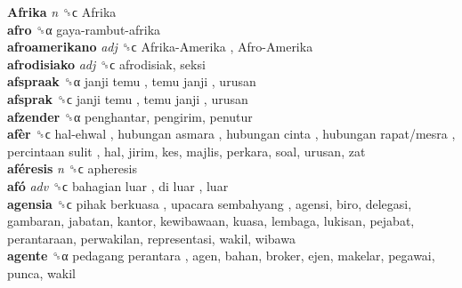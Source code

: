 \textbf{Afrika} \emph{n}  ␝ϲ   Afrika   \\
\textbf{afro} ␝α   gaya-rambut-afrika   \\
\textbf{afroamerikano} \emph{adj}  ␝ϲ   Afrika-Amerika ,  Afro-Amerika   \\
\textbf{afrodisiako} \emph{adj}  ␝ϲ  afrodisiak, seksi  \\
\textbf{afspraak} ␝α   janji temu ,  temu janji , urusan  \\
\textbf{afsprak} ␝ϲ   janji temu ,  temu janji , urusan  \\
\textbf{afzender} ␝α  penghantar, pengirim, penutur  \\
\textbf{afèr} ␝ϲ   hal-ehwal ,  hubungan asmara ,  hubungan cinta ,  hubungan rapat/mesra ,  percintaan sulit , hal, jirim, kes, majlis, perkara, soal, urusan, zat  \\
\textbf{aféresis} \emph{n}  ␝ϲ  apheresis  \\
\textbf{afó} \emph{adv}  ␝ϲ   bahagian luar ,  di luar , luar  \\
\textbf{agensia} ␝ϲ   pihak berkuasa ,  upacara sembahyang , agensi, biro, delegasi, gambaran, jabatan, kantor, kewibawaan, kuasa, lembaga, lukisan, pejabat, perantaraan, perwakilan, representasi, wakil, wibawa  \\
\textbf{agente} ␝α   pedagang perantara , agen, bahan, broker, ejen, makelar, pegawai, punca, wakil  \\
